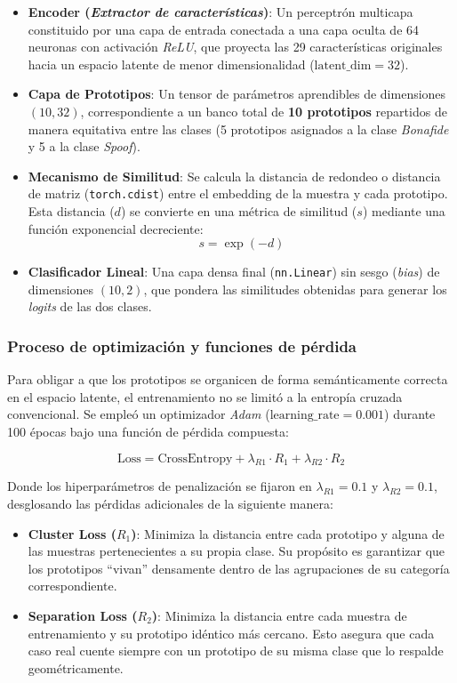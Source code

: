 \begin{itemize}
    \item \textbf{Encoder (\textit{Extractor de características})}: Un perceptrón multicapa constituido por una capa de entrada conectada a una capa oculta de 64 neuronas con activación \textit{ReLU}, que proyecta las 29 características originales hacia un espacio latente de menor dimensionalidad ($\text{latent\_dim} = 32$).
    \item \textbf{Capa de Prototipos}: Un tensor de parámetros aprendibles de dimensiones $(10, 32)$, correspondiente a un banco total de \textbf{10 prototipos} repartidos de manera equitativa entre las clases (5 prototipos asignados a la clase \textit{Bonafide} y 5 a la clase \textit{Spoof}).
    \item \textbf{Mecanismo de Similitud}: Se calcula la distancia de redondeo o distancia de matriz (\texttt{torch.cdist}) entre el embedding de la muestra y cada prototipo. Esta distancia ($d$) se convierte en una métrica de similitud ($s$) mediante una función exponencial decreciente:
    $$s = \exp(-d)$$
    \item \textbf{Clasificador Lineal}: Una capa densa final (\texttt{nn.Linear}) sin sesgo (\textit{bias}) de dimensiones $(10, 2)$, que pondera las similitudes obtenidas para generar los \textit{logits} de las dos clases.
\end{itemize}

\subsubsection*{Proceso de optimización y funciones de pérdida}

Para obligar a que los prototipos se organicen de forma semánticamente correcta en el espacio latente, el entrenamiento no se limitó a la entropía cruzada convencional. Se empleó un optimizador \textit{Adam} ($\text{learning\_rate} = 0.001$) durante 100 épocas bajo una función de pérdida compuesta:

$$\text{Loss} = \text{CrossEntropy} + \lambda_{R1} \cdot R_1 + \lambda_{R2} \cdot R_2$$

Donde los hiperparámetros de penalización se fijaron en $\lambda_{R1} = 0.1$ y $\lambda_{R2} = 0.1$, desglosando las pérdidas adicionales de la siguiente manera:

\begin{itemize}
    \item \textbf{Cluster Loss ($R_1$)}: Minimiza la distancia entre cada prototipo y alguna de las muestras pertenecientes a su propia clase. Su propósito es garantizar que los prototipos ``vivan'' densamente dentro de las agrupaciones de su categoría correspondiente.
    \item \textbf{Separation Loss ($R_2$)}: Minimiza la distancia entre cada muestra de entrenamiento y su prototipo idéntico más cercano. Esto asegura que cada caso real cuente siempre con un prototipo de su misma clase que lo respalde geométricamente.
\end{itemize}

